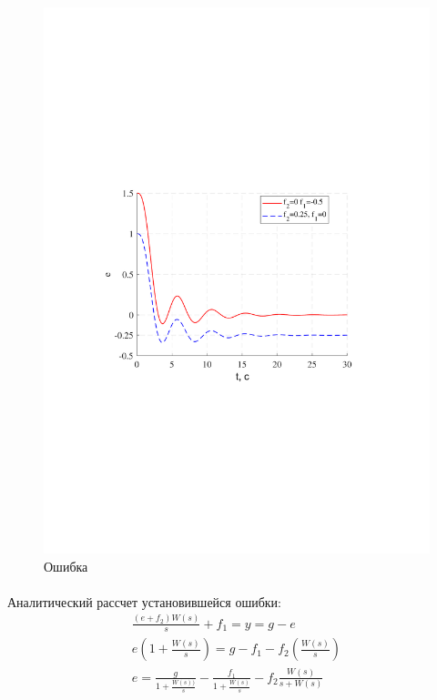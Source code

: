 \documentclass[a4paper,12pt]{article}
\begin{document}
	\begin{figure}[h!]
		\begin{center}
		\renewcommand{\figurename}{Рисунок}
		\includegraphics[width=5in]{vozm1errMOD.pdf}
		\caption{Ошибка}
		\label{s_18}
		\end{center}
	
		
	\end{figure}		
	\newpage
	\paragraph {} Аналитический рассчет установившейся ошибки:\\
	\begin{gather}
	\frac{(e+f_2)W(s)}{s}+f_1=y=g-e\\
	e(1+\frac{W(s)}{s})=g-f_1-f_2(\frac{W(s)}{s})\\
	e=\displaystyle \frac{g}{\displaystyle 1+\frac{W(s))}{s}}-\displaystyle\frac{f_1}{\displaystyle 1+\frac{W(s)}{s}}-f_2\frac{W(s)}{s+W(s)}
	\end{gather}
	
\end{document}
